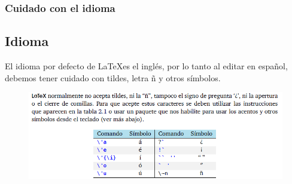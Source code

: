 \begin{frame}
\frametitle{Cuidado con el idioma}
\subsection{Idioma}
\begin{nada}
El idioma por defecto de \LaTeX es el inglés, por lo tanto al editar en español, debemos tener cuidado con tildes, letra ñ y otros símbolos.
\end{nada}
\begin{figure}[h!]
\centering
{\includegraphics[scale=0.5]{Imagenes/imagen7}}
\end{figure}
\end{frame}
